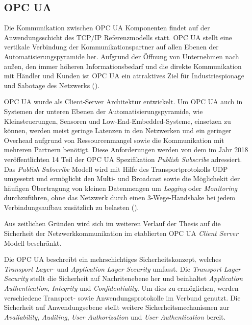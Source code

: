 \subsection{\ac{OPC UA}}
\label{Analyse:OPCUA}
Die Kommunikation zwischen \ac{OPC UA} Komponenten findet auf der Anwendungsschicht des \ac{TCP}/\ac{IP} Referenzmodells statt. \ac{OPC UA} stellt eine vertikale Verbindung der Kommunikationspartner auf allen Ebenen der Automatisierungspyramide her. Aufgrund der Öffnung von Unternehmen nach außen, den immer höheren Informationsbedarf und die direkte Kommunikation mit Händler und Kunden ist \ac{OPC UA} ein attraktives Ziel für Industriespionage und Sabotage des Netzwerks (\cite{opcpt2}). 

\ac{OPC UA} wurde als Client-Server Architektur entwickelt. Um \ac{OPC UA} auch in Systemen der unteren Ebenen der Automatisierungspyramide, wie Kleinsteuerungen, Sensoren und Low-End-Embedded-Systeme, einsetzen zu können, werden meist geringe Latenzen in den Netzwerken und ein geringer Overhead aufgrund von Ressourcenmangel sowie die Kommunikation mit mehreren Partnern benötigt. Diese Anforderungen werden von dem im Jahr 2018 veröffentlichten 14 Teil der \ac{OPC UA} Spezifikation \textit{Publish Subscribe} adressiert. Das \textit{Publish Subscribe} Modell wird mit Hilfe des Transportprotokolls \ac{UDP} umgesetzt und ermöglicht den Multi- und Broadcast sowie die Möglichekit der häufigen Übertragung von kleinen Datenmengen um \textit{Logging} oder \textit{Monitoring} durchzuführen, ohne das Netzwerk durch einen 3-Wege-Handshake bei jedem Verbindungsaufbau zusätzlich zu belasten (\cite{opcpt1}).

Aus zeitlichen Gründen wird sich im weiteren Verlauf der Thesis auf die Sicherheit der Netzwerkkommunikation im etablierten \ac{OPC UA} \textit{Client Server} Modell beschränkt.

Die \ac{OPC UA} beschreibt ein mehrschichtiges Sicherheitskonzept, welches \textit{Transport Layer-} und \textit{Application Layer Security} umfasst. Die \textit{Transport Layer Security} stellt die Sicherheit auf Nachritenebene her und beinhaltet \textit{Application Authentication}, \textit{Integrity} und \textit{Confidentiality}. Um dies zu ermöglichen, werden verschiedene Transport- sowie Anwendungsprotokolle im Verbund genutzt. Die Sicherheit auf Anwendungsebene stellt weitere Sicherheitsmechanismen zur \textit{Availability}, \textit{Auditing}, \textit{User Authorization} und \textit{User Authentication} bereit.

